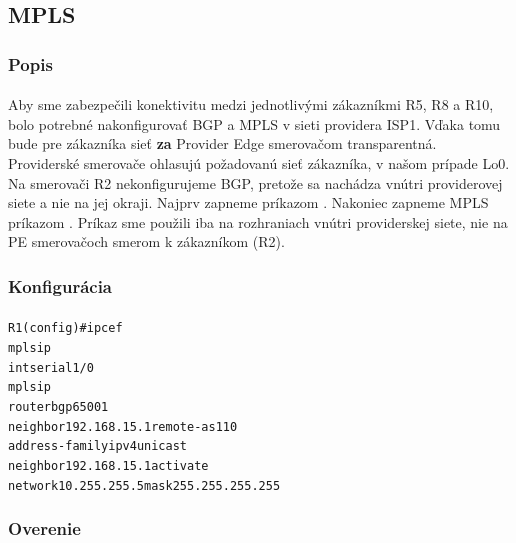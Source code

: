 \documentclass[12pt,twoside,a4paper]{report}
\begin{document}
\subsection{MPLS}
\subsubsection{Popis}
\paragraph{}
Aby sme zabezpečili konektivitu medzi jednotlivými zákazníkmi R5, R8 a R10, bolo potrebné nakonfigurovať BGP a MPLS v sieti providera ISP1. Vďaka tomu bude pre zákazníka sieť \textbf{za} Provider Edge smerovačom transparentná. Providerské smerovače ohlasujú požadovanú sieť zákazníka, v našom prípade Lo0. Na smerovači R2 nekonfigurujeme BGP, pretože sa nachádza vnútri providerovej siete a nie na jej okraji. Najprv zapneme  príkazom . Nakoniec zapneme MPLS príkazom . Príkaz  sme použili iba na rozhraniach vnútri providerskej siete, nie na PE smerovačoch smerom k zákazníkom (R2).

\subsubsection{Konfigurácia}
\paragraph{}
\noindent
{\selectfont
\begin{small}
\begin{alltt}
R1 (config)#ip cef
mpls ip
int serial1/0
  mpls ip
router bgp 65001
  neighbor 192.168.15.1 remote-as 110
  address-family ipv4 unicast
  neighbor 192.168.15.1 activate
  network 10.255.255.5 mask 255.255.255.255
\end{alltt}
\end{small}
}

\subsubsection{Overenie}
\end{document}
